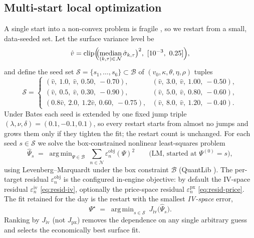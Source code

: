 \documentclass[a4paper, 11pt, reqno]{amsart}
\DeclareMathOperator*{\argmin}{arg\,min}
\DeclareMathOperator{\med}{median}
\DeclareMathOperator{\clip}{clip}
\begin{document}
		\subsection{Multi-start local optimization}\label{sec:multistart}
			A single start into a non-convex problem is fragile \citep{mikhailov2003}, so we restart from a small,
			data-seeded set. Let the surface variance level be
			\begin{equation}\label{eq:varproxy}
				\hat v = \clip\Bigl( \!\! \bigl(\med_{(k,\tau) \in \, \mathcal{N}} \hat\sigma_{k,\tau}\bigr)^2,\ [10^{-3},\ 0.25] \Bigr),
			\end{equation}
			and define the seed set $\mathcal{S}=\{s_1,\dots,s_6\}\subset\mathcal{B}$ of
			$(v_0,\kappa,\theta,\eta,\rho)$ tuples
			\begin{equation}\label{eq:seeds}
				\mathcal{S} =
				\begin{cases}
					(\hat v,\ 1.0,\ \hat v,\ 0.50,\ -0.70), &
					(\hat v,\ 3.0,\ \hat v,\ 1.00,\ -0.50), \\
					(\hat v,\ 0.5,\ \hat v,\ 0.30,\ -0.90), &
					(\hat v,\ 5.0,\ \hat v,\ 0.80,\ -0.60), \\
					(0.8\hat v,\ 2.0,\ 1.2\hat v,\ 0.60,\ -0.75), &
					(\hat v,\ 8.0,\ \hat v,\ 1.20,\ -0.40).
				\end{cases}
			\end{equation}
			Under Bates each seed is extended by one fixed jump triple
			$(\lambda,\nu,\delta)=(0.1,-0.1,0.1)$, so every restart starts from
			almost no jumps and grows them only if they tighten the fit; the restart count is unchanged.
			For each seed $s\in\mathcal{S}$ we solve the box-constrained nonlinear least-squares problem
			\begin{equation}\label{eq:localproblem}
				\widehat\Psi_s \;=\; \argmin_{\Psi \in \mathcal{B}}\ \sum_{n\in\mathcal{N}} \varepsilon^{\mathrm{obj}}_n(\Psi)^2
				\qquad \text{(LM, started at } \Psi^{(0)}=s\text{)},
			\end{equation}
			using Levenberg--Marquardt under the box constraint $\mathcal{B}$ (QuantLib \texttt{}). 
			The per-target residual $\varepsilon^{\mathrm{obj}}_n$ is the configured in-engine objective: 
			by default the IV-space residual $\varepsilon^{\mathrm{iv}}_n$ \eqref{eq:resid-iv}, optionally 
			the price-space residual $\varepsilon^{\mathrm{px}}_n$ \eqref{eq:resid-price}. The fit retained 
			for the day is the restart with the smallest \emph{IV-space} error,
			\begin{equation}\label{eq:select}
				\Psi^\star \;=\; \argmin_{s\in\mathcal{S}}\ J_{\mathrm{iv}}\!\bigl(\widehat\Psi_s\bigr).
			\end{equation}
			Ranking by $J_{\mathrm{iv}}$ (not $J_{\mathrm{px}}$) removes the dependence on any single
			arbitrary guess and selects the economically best surface fit.
\end{document}
